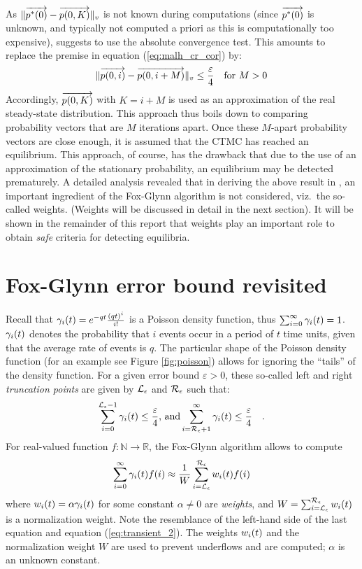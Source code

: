 \documentclass[a4paper,11pt]{article}
\newcommand{\Section}[1]{\section{#1}}
\begin{document}
		As $\lVert \overrightarrow{p^{*}(0)} - \overrightarrow{p(0,K)} \rVert_{v}$ is not known during computations (since $\overrightarrow{p^{*}(0)}$ is unknown, and typically not computed a priori as this is computationally too expensive), \cite{MalhotraMT_MR94} suggests to use the absolute convergence test.  This amounts to replace the premise in equation (\ref{eq:malh_cr_cor}) by:
		\begin{equation}
			\lVert \overrightarrow{p(0,i)} - \overrightarrow{p(0,i+M)} \rVert_{v} \leq \frac{\varepsilon}{4} \quad \mbox{for } M > 0 \label{eq:malh_cr}
		\end{equation}
		Accordingly, $\overrightarrow{p(0,K)}$ with $K = i{+}M$ is used as an approximation of the real steady-state distribution.  This approach thus boils down to comparing probability vectors that are $M$ iterations apart.  Once these $M$-apart probability vectors are close enough, it is assumed that the CTMC has reached an equilibrium.  This approach, of course, has the drawback that due to the use of an approximation of the stationary probability, an equilibrium may be detected prematurely.  A detailed analysis revealed that in deriving the above result in \cite{MalhotraMT_MR94},  an important ingredient of the Fox-Glynn algorithm is not considered, viz.\ the so-called weights.  (Weights will be discussed in detail in the next section).   It will be shown in the remainder of this report that weights play an important role to obtain \emph{safe} criteria for detecting equilibria.

\Section{Fox-Glynn error bound revisited \label{s:fox_glynn_ref}}
	
	Recall that  $\gamma_{i}(t) = e^{-q t}\frac{\left( q t \right)^{i}}{i!}$ is a Poisson density function, thus $\sum_{i=0}^{\infty}\gamma_{i}(t) = 1$.  $\gamma_{i}(t)$ denotes the probability that $i$ events occur in a period of $t$ time units, given that the average rate of events is $q$.  The particular shape of the Poisson density function (for an example see Figure \ref{fig:poisson}) allows for ignoring the ``tails'' of the density function.  For a given error bound $\varepsilon > 0$, these so-called left and right \emph{truncation points} are given by $\mathcal{L}_{\epsilon}$ and $\mathcal{R}_{\epsilon}$ such that:
	$$ \sum_{i=0}^{\mathcal{L}_{\epsilon}{-}1}\gamma_{i}(t) \leq \frac{\varepsilon}{4} \text{, and} \sum_{i=\mathcal{R}_{\epsilon}{+}1}^{\infty}\gamma_{i}(t) \leq \frac{\varepsilon}{4} \quad .$$
	For real-valued function $f : \mathbb{N} \to \mathbb{R}$, the Fox-Glynn algorithm \cite{FoxG_ACM88} allows to compute
	\begin{equation}
	 	\sum_{i=0}^{\infty} \gamma_{i}(t) f(i) \approx \frac{1}{W}\sum_{i = \mathcal{L}_{\epsilon}}^{\mathcal{R}_{\epsilon}} w_{i}(t) f(i) \nonumber
	 \end{equation}
	 where $w_{i}(t) = \alpha \gamma_{i}(t)$ for some constant $\alpha \neq 0$ are \emph{weights}, and $W = \sum_{i=\mathcal{L}_{\epsilon}}^{\mathcal{R}_{\epsilon}} w_{i}(t)$ is a normalization weight.  Note the resemblance of the left-hand side of the last equation and equation (\ref{eq:transient_2}).  The weights $w_{i}(t)$ and the normalization weight $W$ are used to prevent underflows and are computed; $\alpha$ is an unknown constant.
	
\end{document}
